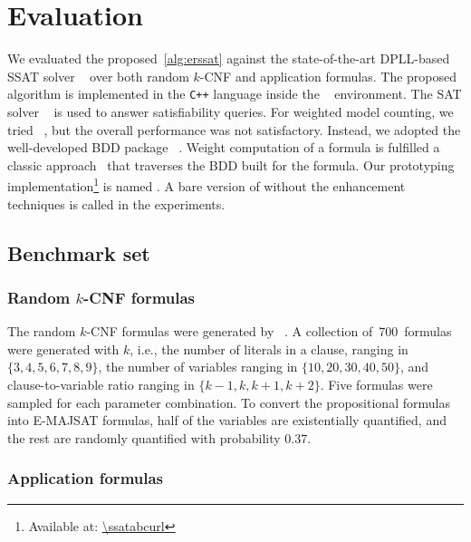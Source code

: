 \newcommand{\nrandom}{\num{700}}
\newcommand{\napplication}{\num{160}}
\newcommand{\ntoilet}{\num{77}}
\newcommand{\nmaxcount}{\num{26}}
\newcommand{\nsandcastle}{\num{25}}
\newcommand{\nconformant}{\num{24}}
\newcommand{\nmpec}{\num{8}}

\section{Evaluation}
\label{sect:erssat-evaluation}

We evaluated the proposed~\cref{alg:erssat} against
the state-of-the-art DPLL-based SSAT solver \dcssat~\cite{Majercik2005}
over both random $k$-CNF and application formulas.
The proposed algorithm is implemented in the \texttt{C++} language inside the \abc~\cite{ABC} environment.
The SAT solver ~\cite{Een2003Solver} is used to answer satisfiability queries.
For weighted model counting,
we tried \cachet~\cite{Sang2004,Sang2005ModelCounting},
but the overall performance was not satisfactory.
Instead, we adopted the well-developed BDD package \cudd~\cite{CUDD}.
Weight computation of a formula is fulfilled a classic approach~\cite{Darwiche2002KnowledgeCompilation} that traverses the BDD built for the formula.
Our prototyping implementation\footnote{Available at: \url{\ssatabcurl}} is named \erssat.
A bare version of \erssat without the enhancement techniques is called \erssatb in the experiments.

\subsection{Benchmark set}

\subsubsection{Random $k$-CNF formulas}

The random $k$-CNF formulas were generated by \cnfgen~\cite{Lauria2017CNFgen}.
A collection of~\nrandom~formulas were generated with $k$,
i.e., the number of literals in a clause,
ranging in $\{3,4,5,6,7,8,9\}$,
the number of variables ranging in $\{10,20,30,40,50\}$,
and clause-to-variable ratio ranging in $\{k-1,k,k+1,k+2\}$.
Five formulas were sampled for each parameter combination.
To convert the propositional formulas into E-MAJSAT formulas,
half of the variables are existentially quantified, and the rest are randomly quantified with probability $0.37$.

\subsubsection{Application formulas}

